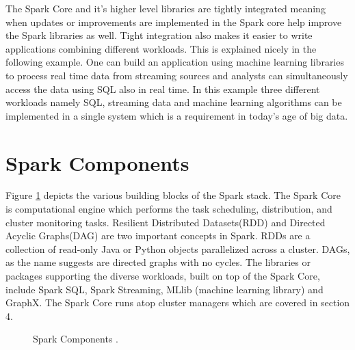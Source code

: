 \documentclass[9pt,twocolumn,twoside]{../../styles/osajnl}
\begin{document}
The Spark Core and it's higher level libraries are tightly integrated
meaning when updates or improvements are implemented in the Spark core
help improve the Spark libraries as well. Tight integration also makes
it easier to write applications combining different workloads. This is
explained nicely in the following example. One can build an
application using machine learning libraries to process real time data
from streaming sources and analysts can simultaneously access the data
using SQL also in real time.  In this example three different
workloads namely SQL, streaming data and machine learning algorithms
can be implemented in a single system which is a requirement in
today’s age of big data.

\section{Spark Components}

Figure \ref{fig:spark-stack} depicts the various building blocks of
the Spark stack. The Spark Core is computational engine which performs
the task scheduling, distribution, and cluster monitoring
tasks. Resilient Distributed Datasets(RDD) \cite{paper-RDD} and
Directed Acyclic Graphs(DAG) are two important concepts in Spark. RDDs
are a collection of read-only Java or Python objects parallelized
across a cluster. DAGs, as the name suggests are directed graphs with
no cycles. The libraries or packages supporting the diverse workloads,
built on top of the Spark Core, include Spark SQL, Spark Streaming,
MLlib (machine learning library) and GraphX. The Spark Core runs atop
cluster managers which are covered in section 4.

\begin{figure}[htbp]
\centering
{}
\caption{Spark Components \cite{book-spark}.}
\label{fig:spark-stack}
\end{figure}
\end{document}
